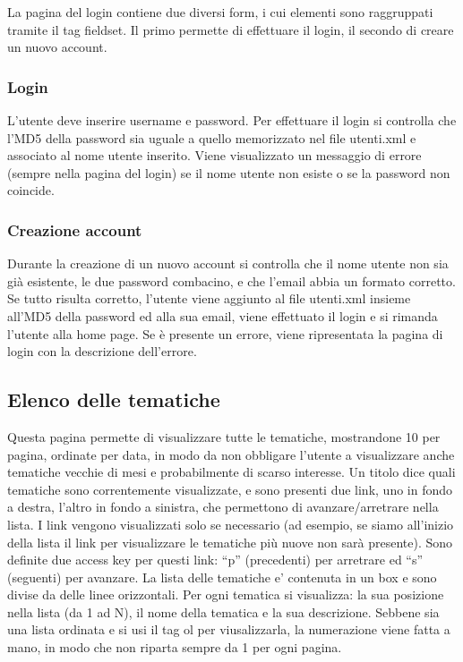 \documentclass[a4paper,10pt]{article}
\begin{document}
La pagina del login contiene due diversi form, i cui elementi sono raggruppati tramite il tag fieldset. Il primo permette di effettuare il login, il secondo di creare un nuovo account.

\subsubsection{Login}
L'utente deve inserire username e password. Per effettuare il login si controlla che l'MD5 della password sia uguale a quello memorizzato nel file utenti.xml e associato al nome utente inserito. Viene visualizzato un messaggio di errore (sempre nella pagina del login) se il nome utente non esiste o se la password non coincide.
\subsubsection{Creazione account}
Durante la creazione di un nuovo account si controlla che il nome utente non sia gi\`a esistente, le due password combacino, e che l'email abbia un formato corretto. Se tutto risulta corretto, l'utente viene aggiunto al file utenti.xml insieme all'MD5 della password ed alla sua email, viene effettuato il login e si rimanda l'utente alla home page. Se \`e presente un errore, viene ripresentata la pagina di login con la descrizione dell'errore.

\subsection{Elenco delle tematiche}

Questa pagina permette di visualizzare tutte le tematiche, mostrandone 10 per pagina, ordinate per data, in modo da non obbligare l'utente a visualizzare anche tematiche vecchie di mesi e probabilmente di scarso interesse. Un titolo dice quali tematiche sono correntemente visualizzate, e sono presenti due link, uno in fondo a destra, l'altro in fondo a sinistra, che permettono di avanzare/arretrare nella lista. I link vengono visualizzati solo se necessario (ad esempio, se siamo all'inizio della lista il link per visualizzare le tematiche pi\`u nuove non sar\`a presente). Sono definite due access key per questi link: ``p'' (precedenti) per arretrare ed ``s'' (seguenti) per avanzare.
La lista delle tematiche e' contenuta in un box e sono divise da delle linee orizzontali. Per ogni tematica si visualizza: la sua posizione nella lista (da 1 ad N), il nome della tematica e la sua descrizione. Sebbene sia una lista ordinata e si usi il tag ol per viusalizzarla, la numerazione viene fatta a mano, in modo che non riparta sempre da 1 per ogni pagina.
\end{document}
